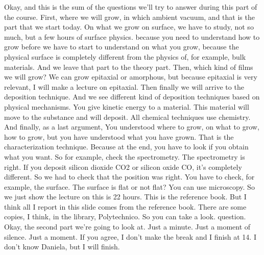 Okay, and this is the sum of the questions we'll try to answer during this part of the course. First, where we will grow, in which ambient vacuum, and that is the part that we start today. On what we grow on surface, we have to study, not so much, but a few hours of surface physics. because you need to understand how to grow before we have to start to understand on what you grow, because the physical surface is completely different from the physics of, for example, bulk materials. And we leave that part to the theory part. Then, which kind of films we will grow? We can grow epitaxial or amorphous, but because epitaxial is very relevant, I will make a lecture on epitaxial. Then finally we will arrive to the deposition technique. And we see different kind of deposition techniques based on physical mechanisms. You give kinetic energy to a material. This material will move to the substance and will deposit. All chemical techniques use chemistry. And finally, as a last argument, You understood where to grow, on what to grow, how to grow, but you have understood what you have grown. That is the characterization technique. Because at the end, you have to look if you obtain what you want. So for example, check the spectrometry. The spectrometry is right. If you deposit silicon dioxide CO2 or silicon oxide CO, it's completely different. So we had to check that the position was right. You have to check, for example, the surface. The surface is flat or not flat? You can use microscopy. So we just show the lecture on this is 22 hours. This is the reference book. But I think all I report in this slide comes from the reference book. There are some copies, I think, in the library, Polytechnico. So you can take a look. question. Okay, the second part we're going to look at. Just a minute. Just a moment of silence. Just a moment. If you agree, I don't make the break and I finish at 14. I don't know Daniela, but I will finish.
